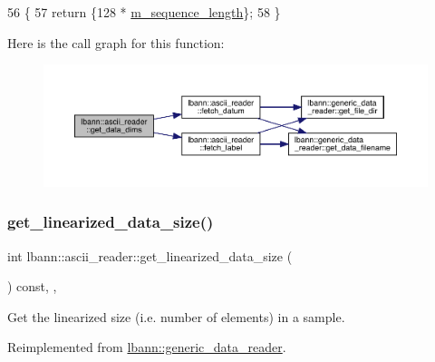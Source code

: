 \begin{DoxyCode}
56                                                       \{
57     \textcolor{keywordflow}{return} \{128 * \hyperlink{classlbann_1_1ascii__reader_a5788fa7418a086de968929d0d4cb4fa4}{m\_sequence\_length}\};
58   \}
\end{DoxyCode}
Here is the call graph for this function\+:\nopagebreak
\begin{figure}[H]
\begin{center}
\leavevmode
\includegraphics[width=350pt]{classlbann_1_1ascii__reader_afcd9c809960f236996e7838a995c0edd_cgraph}
\end{center}
\end{figure}
\mbox{\label{classlbann_1_1ascii__reader_adbbcd2eba6b3e0c985dcfaa24cb78aa0}} 
\subsubsection{\texorpdfstring{get\+\_\+linearized\+\_\+data\+\_\+size()}{get\_linearized\_data\_size()}}
{\footnotesize\ttfamily int lbann\+::ascii\+\_\+reader\+::get\+\_\+linearized\+\_\+data\+\_\+size (\begin{DoxyParamCaption}{ }\end{DoxyParamCaption}) const\hspace{0.3cm}{\ttfamily [inline]}, {\ttfamily [override]}, {\ttfamily [virtual]}}



Get the linearized size (i.\+e. number of elements) in a sample. 



Reimplemented from \hyperlink{classlbann_1_1generic__data__reader_a246a719477c8c7b6122d41b6f5618d41}{lbann\+::generic\+\_\+data\+\_\+reader}.



